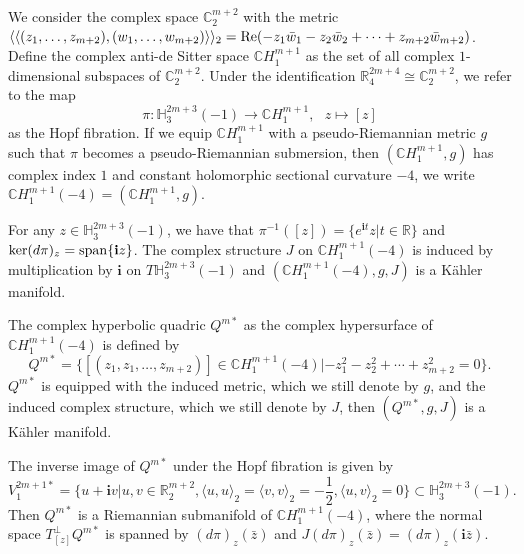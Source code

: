 \documentclass[reqno]{amsart}%
\theoremstyle{definition}
\numberwithin{equation}{section}
\begin{document}
We consider the complex space $\mathbb{C}^{m+2}_2$ with the metric $\langle\langle(z_1,\ldots, z_{m+2}),(w_1,\ldots, w_{m+2})\rangle\rangle_2={\rm Re}(-z_1\bar{w}_1-z_2\bar{ w}_2+\cdots+z_{m+2}\bar{w}_{m+2})$.
Define the complex anti-de Sitter space $\mathbb{C}H^{m+1}_1$ as the set of all complex $1$-dimensional subspaces of $\mathbb{C}^{m+2}_2$. Under the identification $\mathbb{R}^{2m+4}_4\cong \mathbb{C}^{m+2}_2$, we refer to the map
$$
\pi:\mathbb{H}^{2m+3}_3(-1)\rightarrow \mathbb{C}H^{m+1}_1,\ \ \ z\mapsto[z]
$$
as the Hopf fibration. If we equip $\mathbb{C}H^{m+1}_1$ with a pseudo-Riemannian metric $g$ such that $\pi$
becomes a pseudo-Riemannian submersion, then $(\mathbb{C}H^{m+1}_1,g)$ 
has complex index $1$ and constant holomorphic sectional
curvature $-4$, we write  $\mathbb{C}H^{m+1}_1(-4)=(\mathbb{C}H^{m+1}_1,g)$.

For any
$z\in \mathbb{H}^{2m+3}_3(-1)$, we have that $\pi^{-1}([z])=\{e^{\mathbf{i}t}z|t\in \mathbb{R}\}$ and
${\rm ker}(d\pi)_z={\rm span}\{\mathbf{i}z\}$. The complex structure $J$
on $\mathbb{C}H^{m+1}_1(-4)$ is induced by multiplication by $\mathbf{i}$ on $T\mathbb{H}^{2m+3}_3(-1)$ and
$(\mathbb{C}H^{m+1}_1(-4), g, J)$ is a K\"{a}hler manifold.

The complex hyperbolic quadric $Q^{m*}$ as the complex hypersurface of $\mathbb{C}H^{m+1}_1(-4)$ is defined by
$$
Q^{m*}=\{[(z_1,z_1,\ldots,z_{m+2})]\in \mathbb{C}H^{m+1}_1(-4)|-z_1^2-z_2^2+\cdots+z_{m+2}^2=0\}.
$$
$Q^{m*}$ is equipped with the induced metric, which we still denote by $g$, and the induced complex structure, which we still denote by $J$, then $(Q^{m*}, g, J)$ is a K\"{a}hler manifold.


The inverse image of $Q^{m*}$ under the Hopf fibration is given by
$$
V^{2m+1*}_1=\{u+\mathbf{i}v|u,v\in \mathbb{R}^{m+2}_2,\langle u,u\rangle_2=\langle v,v\rangle_2=-\frac{1}{2},
\langle u,v\rangle_2=0\}\subset \mathbb{H}^{2m+3}_3(-1).
$$
Then $Q^{m*}$ is a Riemannian submanifold of $\mathbb{C}H^{m+1}_1(-4)$, where the normal space
$T^\perp_{[z]}Q^{m*}$ is spanned by $(d\pi)_z(\bar{z})$ and $J(d\pi)_z(\bar{z})=(d\pi)_z(\mathbf{i}\bar{z})$.

\end{document}
